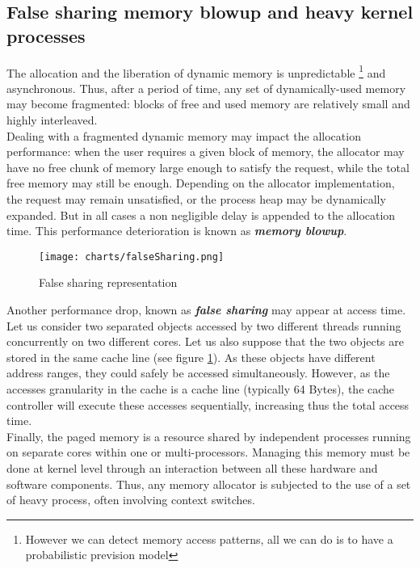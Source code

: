 \documentclass[10pt]{article}											%
\begin{document}
\subsection{False sharing memory blowup and heavy kernel processes}
The allocation and the liberation of dynamic memory is unpredictable \footnote{However we can detect memory access patterns, all we can do is to have a probabilistic prevision model} and asynchronous.   Thus, after a period of time, any set of dynamically-used memory may become fragmented:   blocks of free and used memory are relatively small and highly interleaved.\\
Dealing with a fragmented dynamic memory may impact the allocation performance:   when the user requires a given block of memory, the allocator may have no free chunk of memory large enough to satisfy the request, while the total free memory may still be enough.   Depending on the allocator implementation, the request may remain unsatisfied, or the process heap may be dynamically expanded.   But in all cases a non negligible delay is appended to the allocation time.   This performance deterioration is known as \textbf{\textit{memory blowup}}.\\

	\begin{figure}
				\texttt{[image: charts/falseSharing.png]}
		\caption{False sharing representation}
		\label{falseSharing.png}
	\end{figure}

Another performance drop, known as \textbf{\textit{false sharing}} may appear at access time.   Let us consider two separated objects accessed by two different threads running concurrently on two different cores.   Let us also suppose that the two objects are stored in the same cache line (see figure \ref{falseSharing.png}).   As these objects have different address ranges, they could safely be accessed simultaneously.   However, as the accesses granularity in the cache is a cache line (typically 64 Bytes), the cache controller will execute these accesses sequentially, increasing thus the total access time.\\

Finally, the paged memory is a resource shared by independent processes running on separate cores within one or multi-processors.   Managing this memory must be done at kernel level through an interaction between all these hardware and software components.   Thus, any memory allocator is subjected to the use of a set of heavy process, often involving context switches.
\end{document}
